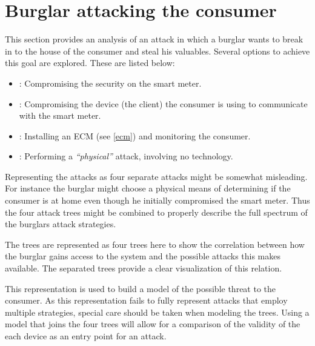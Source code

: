 \section{Burglar attacking the consumer}\label{attacktree:burglar}
This section provides an analysis of an attack in which a burglar wants to break in to the house of the consumer and steal his valuables.
Several options to achieve this goal are explored.
These are listed below:
\begin{itemize}
  \item {}: Compromising the security on the smart meter.
  \item {}: Compromising the device (the client) the consumer is using to communicate with the smart meter.
  \item {}: Installing an ECM (see \cref{ecm}) and monitoring the consumer.
  \item {}: Performing a \emph{``physical''} attack, involving no technology.
\end{itemize}

Representing the attacks as four separate attacks might be somewhat misleading.
For instance the burglar might choose a physical means of determining if the consumer is at home even though he initially compromised the smart meter.
Thus the four attack trees might be combined to properly describe the full spectrum of the burglars attack strategies.

The trees are represented as four trees here to show the correlation between how the burglar gains access to the system and the possible attacks this makes available.
The separated trees provide a clear visualization of this relation.

This representation is used to build a model of the possible threat to the consumer.
As this representation fails to fully represent attacks that employ multiple strategies, special care should be taken when modeling the trees.
Using a model that joins the four trees will allow for a comparison of the validity of the each device as an entry point for an attack.




